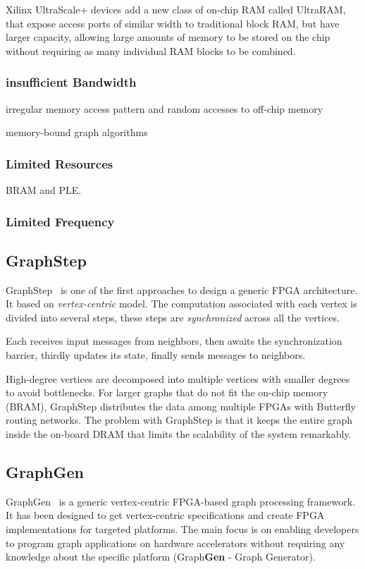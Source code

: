 \documentclass[UTF8,12pt,a4paper]{article}
\begin{document}
Xilinx UltraScale+ devices add a new class of on-chip RAM called UltraRAM,
that expose access ports of similar width to traditional block RAM,
but have larger capacity, allowing large amounts of memory to be stored on the chip
without requiring as many individual RAM blocks to be combined.
\subsubsection{insufficient Bandwidth}
\begin{compactitem}
  \item irregular memory access pattern and random accesses to off-chip memory
  \item memory-bound graph algorithms
\end{compactitem}

\subsubsection{Limited Resources}
BRAM and PLE.
\subsubsection{Limited Frequency}

\subsection{GraphStep}
GraphStep~\cite{DBLP:conf/fccm/DeLorimierKMRERUKD06}
is one of the first approaches to design a generic FPGA architecture.
It based on \textit{vertex-centric} model.
The computation associated with each vertex is divided into several steps,
these steps are \textit{synchronized} across all the vertices.

Each receives input messages from neighbors,
then awaits the synchronization barrier,
thirdly updates its state,
finally sends messages to neighbors.

High-degree vertices are decomposed into
multiple vertices with smaller degrees to avoid bottlenecks.
For larger graphs that do not fit the on-chip memory (BRAM),
GraphStep distributes the data among multiple FPGAs with Butterfly routing networks.
The problem with GraphStep is that it keeps the entire graph inside the on-board DRAM
that limits the scalability of the system remarkably.

\subsection{GraphGen}
GraphGen~\cite{DBLP:conf/fccm/NurvitadhiWWHNH14}
is a generic vertex-centric FPGA-based graph processing framework.
It has been designed to get vertex-centric specifications
and create FPGA implementations for targeted platforms.
The main focus is on enabling developers to program graph applications
on hardware accelerators without requiring any knowledge about the specific platform
(Graph\textbf{Gen} - Graph Generator).
\end{document}

